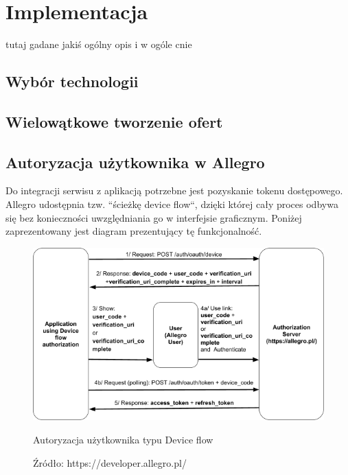 \chapter{Implementacja}
\label{cha:implementacja}

tutaj gadane jakiś ogólny opis i w ogóle cnie


\section{Wybór technologii}


\section{Wielowątkowe tworzenie ofert}


\section{Autoryzacja użytkownika w Allegro}

Do integracji serwisu z aplikacją potrzebne jest pozyskanie tokenu dostępowego. Allegro udostępnia tzw. ``ścieżkę device flow``, dzięki której cały proces odbywa się bez konieczności uwzględniania go w interfejsie graficznym. Poniżej zaprezentowany jest diagram prezentujący tę funkcjonalność.\\

\begin{figure}[H]
	\centering
	\includegraphics[width=\linewidth]{device_flow.png}
	\caption{Autoryzacja użytkownika typu Device flow}
	\caption*{Źródło: {https://developer.allegro.pl/}}
\end{figure}

